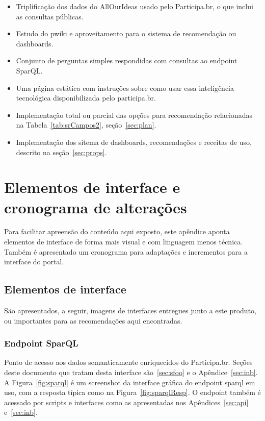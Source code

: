 \documentclass[12pt]{article}
\begin{document}
\begin{itemize}
    \item Triplificação dos dados do AllOurIdeas usado pelo Participa.br, o que inclui as consultas públicas.
    \item Estudo do pwiki e aproveitamento para o sistema de recomendação ou dashboards.
    \item Conjunto de perguntas simples respondidas com consultas ao endpoint SparQL.
    \item Uma página estática com instruções sobre como usar essa inteligência tecnológica disponibilizada pelo participa.br.
    \item Implementação total ou parcial das opções para recomendação relacionadas na Tabela~\ref{tab:srCampos2}, seção~\ref{sec:plan}.
    \item Implementação dos sitema de dashboards, recomendações e receitas de uso, descrito na seção~\ref{sec:props}.
\end{itemize}

\section{Elementos de interface e cronograma de alterações}
Para facilitar apreensão do conteúdo aqui exposto, este apêndice aponta elementos de interface de forma mais visual e com linguagem menos técnica. Também é apresentado um cronograma para adaptações e incrementos para a interface do portal.
\subsection{Elementos de interface}
São apresentados, a seguir, imagens de interfaces entregues junto a este produto, ou importantes para as recomendações aqui encontradas. 
\subsubsection{Endpoint SparQL}
Ponto de acesso aos dados semanticamente enriquecidos do Participa.br. Seções deste documento que tratam desta interface são~\ref{sec:sfoo} e o Apêndice~\ref{sec:inb}. A Figura~\ref{fig:sparql} é um screenshot da interface gráfica do endpoint sparql em uso, com a resposta típica como na Figura~\ref{fig:sparqlResp}. O endpoint também é acessado por scripts e interfaces como as apresentadas nos Apêndices~\ref{sec:api} e~\ref{sec:inb}.
\end{document}
